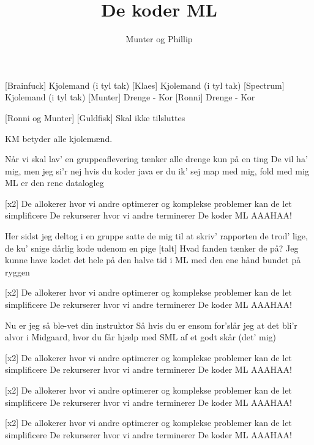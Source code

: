 \documentclass[a4paper,11pt]{article}
\title{De koder ML}
\author{Munter og Phillip}
\begin{document}
\maketitle

\begin{roles}  
[Brainfuck] Kjolemand (i tyl tak)
[Klaes] Kjolemand (i tyl tak)
[Spectrum] Kjolemand (i tyl tak)
[Munter] Drenge - Kor
[Ronni] Drenge - Kor
\end{roles}

\begin{props}
[Ronni og Munter]
[Guldfisk] Skal ikke tilsluttes
\end{props}

\begin{song}
KM betyder alle kjolemænd.

 Når vi skal lav' en gruppeaflevering
tænker alle drenge kun på en ting
 De vil ha' mig, men jeg si'r nej
 hvis du koder java er du ik' sej
 map med mig, fold med mig
 ML er den rene datalogleg

[x2] De allokerer hvor vi andre optimerer
og komplekse problemer kan de let simplificere
De rekurserer hvor vi andre terminerer
De koder ML
 AAAHAA!

 Her sidst jeg deltog i en gruppe
satte de mig til at skriv' rapporten
 de trod' lige, de ku' snige
 dårlig kode udenom en pige
[talt] Hvad fanden tænker de på?
Jeg kunne have kodet det hele på den halve tid i ML med den ene hånd bundet på ryggen

[x2] De allokerer hvor vi andre optimerer
og komplekse problemer kan de let simplificere
De rekurserer hvor vi andre terminerer
De koder ML
 AAAHAA!



 Nu er jeg så ble-vet din instruktor
Så hvis du er ensom for'slår jeg at det bli'r alvor
i Midgaard, hvor du får
hjælp med SML af et godt skår (det' mig)

[x2] De allokerer hvor vi andre optimerer
og komplekse problemer kan de let simplificere
De rekurserer hvor vi andre terminerer
De koder ML
 AAAHAA!

[x2] De allokerer hvor vi andre optimerer
og komplekse problemer kan de let simplificere
De rekurserer hvor vi andre terminerer
De koder ML
 AAAHAA!

[x2] De allokerer hvor vi andre optimerer
og komplekse problemer kan de let simplificere
De rekurserer hvor vi andre terminerer
De koder ML
 AAAHAA!

\end{song}
\end{document}

